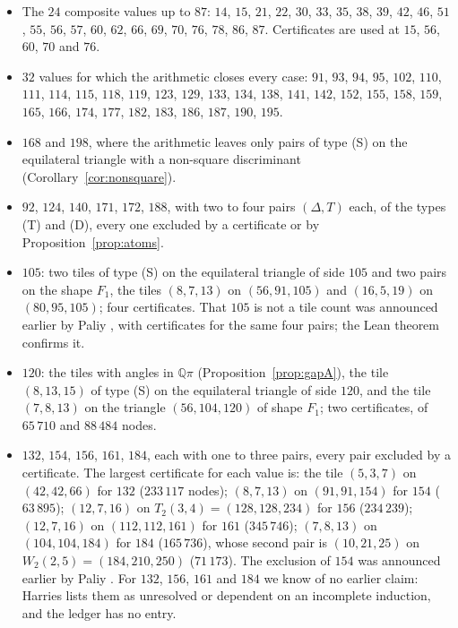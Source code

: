 \documentclass[11pt,reqno]{amsart}
\theoremstyle{plain}
\theoremstyle{definition}
\newcommand{\Q}{\mathbb{Q}}
\begin{document}
\begin{itemize}
\item The $24$ composite values up to $87$: $14$, $15$, $21$, $22$, $30$, $33$, $35$, $38$, $39$, $42$, $46$,
$51$, $55$, $56$, $57$, $60$, $62$, $66$, $69$, $70$, $76$, $78$, $86$, $87$. Certificates are used at
$15$, $56$, $60$, $70$ and $76$.
\item $32$ values for which the arithmetic closes every case: $91$, $93$, $94$, $95$, $102$, $110$, $111$,
$114$, $115$, $118$, $119$, $123$, $129$, $133$, $134$, $138$, $141$, $142$, $152$, $155$, $158$, $159$,
$165$, $166$, $174$, $177$, $182$, $183$, $186$, $187$, $190$, $195$.
\item $168$ and $198$, where the arithmetic leaves only pairs of type (S) on the equilateral triangle with a
non-square discriminant (Corollary~\ref{cor:nonsquare}).
\item $92$, $124$, $140$, $171$, $172$, $188$, with two to four pairs $(\Delta,T)$ each, of the types (T)
and (D), every one excluded by a certificate or by Proposition~\ref{prop:atoms}.
\item $105$: two tiles of type (S) on the equilateral triangle of side $105$ and two pairs on the shape
$F_1$, the tiles $(8,7,13)$ on $(56,91,105)$ and $(16,5,19)$ on $(80,95,105)$; four certificates. That $105$
is not a tile count was announced earlier by Paliy \cite{Paliy634}, with certificates for the same four
pairs; the Lean theorem confirms it.
\item $120$: the tiles with angles in $\Q\pi$ (Proposition~\ref{prop:gapA}), the tile $(8,13,15)$ of type
(S) on the equilateral triangle of side $120$, and the tile $(7,8,13)$ on the triangle $(56,104,120)$ of
shape $F_1$; two certificates, of $65\,710$ and $88\,484$ nodes.
\item $132$, $154$, $156$, $161$, $184$, each with one to three pairs, every pair excluded by a certificate.
The largest certificate for each value is: the tile $(5,3,7)$ on $(42,42,66)$ for $132$ ($233\,117$ nodes);
$(8,7,13)$ on $(91,91,154)$ for $154$ ($63\,895$); $(12,7,16)$ on $T_2(3,4)=(128,128,234)$ for $156$
($234\,239$); $(12,7,16)$ on $(112,112,161)$ for $161$ ($345\,746$); $(7,8,13)$ on $(104,104,184)$ for
$184$ ($165\,736$), whose second pair is $(10,21,25)$ on $W_2(2,5)=(184,210,250)$ ($71\,173$). The exclusion
of $154$ was announced earlier by Paliy
\cite{PaliyLedger}. For $132$, $156$, $161$ and $184$ we know of no earlier claim: Harries
\cite{Harries634} lists them as unresolved or dependent on an incomplete induction, and the ledger has no
entry.
\end{itemize}
\end{document}
